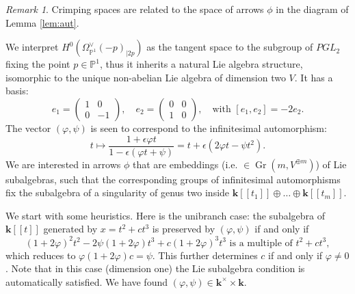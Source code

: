 \documentclass{compositio}
\newcommand{\PP}{\mathbb P}
\renewcommand{\k}{\mathbf k}
\theoremstyle{plain}
\theoremstyle{definition}
\theoremstyle{remark}
\newtheorem{rem}[thm]{Remark}
\begin{document}
\begin{rem}
 Crimping spaces are related to the space of arrows $\phi$ in the diagram of Lemma \ref{lem:aut}.
 
 We interpret $H^0(\Omega_{\PP^1}^\vee(-p)_{|2p})$ as the tangent space to the subgroup of $PGL_2$ fixing the point $p\in\PP^1$, thus it inherits a natural Lie algebra structure, isomorphic to the unique non-abelian Lie algebra of dimension two $V$. It has a basis: \[e_1=\begin{pmatrix} 1 & 0 \\ 0 & -1\end{pmatrix}, \quad e_2=\begin{pmatrix} 0 & 0 \\ 1 & 0\end{pmatrix},\quad \text{with } [e_1,e_2]=-2e_2.\]
 The vector $(\varphi,\psi)$ is seen to correspond to the infinitesimal automorphism: \[t\mapsto\frac{1+\epsilon\varphi t}{1-\epsilon(\varphi t+\psi)}=t+\epsilon(2\varphi t-\psi t^2).\]
 We are interested in arrows $\phi$ that are embeddings (i.e. $\in\operatorname{Gr}(m,V^{\oplus m})$) of Lie subalgebras, such that the corresponding groups of infinitesimal automorphisms fix the subalgebra of a singularity of genus two inside $\k[\![t_1]\!]\oplus\ldots\oplus\k[\![t_m]\!]$.
 
 We start with some heuristics. Here is the unibranch case: the subalgebra of $\k[\![t]\!]$ generated by $x=t^2+ct^3$ is preserved by $(\varphi,\psi)$ if and only if
 \[(1+2\varphi)^2t^2-2\psi(1+2\varphi)t^3+c(1+2\varphi)^3t^3\text{ is a multiple of } t^2+ct^3,\]
 which reduces to $\varphi(1+2\varphi)c=\psi$. This further determines $c$ if and only if $\varphi\neq 0$. Note that in this case (dimension one) the Lie subalgebra condition is automatically satisfied. We have found $(\varphi,\psi)\in\k^\times\times\k$.
 

\end{rem}
\end{document}
